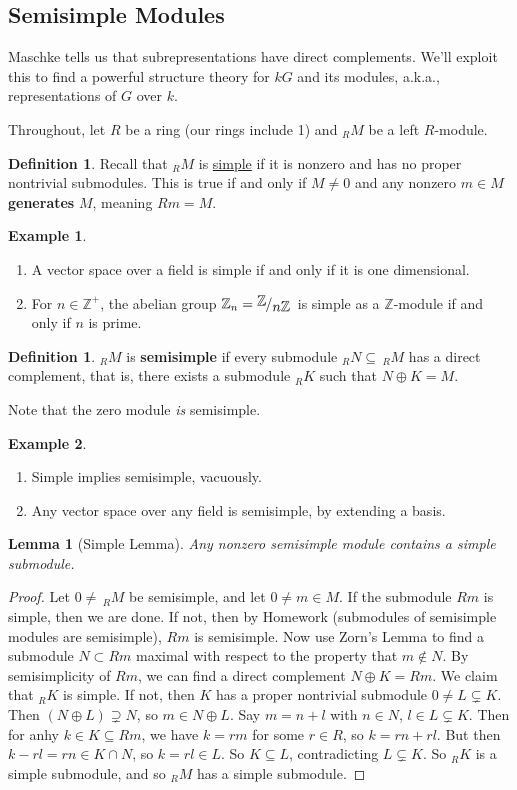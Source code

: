 \documentclass[12pt]{article}
\newcommand{\z}{\mathbb{Z}}
\newcommand{\ita}[1]{\textit{#1}}
\newcommand{\quotient}[2]{{\makebox[\width-2.3pt][l]{\raisebox{.2em}{$#1$}}\left/\raisebox{-.2em}{$#2$}\right.}}
\newtheorem{lemma}[theorem]{Lemma}
\theoremstyle{definition}
\newtheorem{definition}[theorem]{Definition}
\newtheorem{example}{Example}[section]
\begin{document}
\subsection{Semisimple Modules}
Maschke tells us that subrepresentations have direct complements. We'll exploit this to find a powerful structure theory for $kG$ and its modules, a.k.a., representations of $G$ over $k$.

Throughout, let $R$ be a ring (our rings include 1) and $_RM$ be a left $R$-module.
\begin{definition}
    Recall that $_RM$ is \underline{simple} if it is nonzero and has no proper nontrivial submodules. This is true if and only if $M\neq0$ and any nonzero $m\in M$ \textbf{generates} $M$, meaning $Rm=M$.
\end{definition}
\begin{example}
    \noindent
    \begin{enumerate}
        \item A vector space over a field is simple if and only if it is one dimensional.
        \item For $n\in\z^+$, the abelian group $\z_n=\quotient{\z}{n\z}$ is simple as a $\z$-module if and only if $n$ is prime.
    \end{enumerate}
\end{example}
\begin{definition}
    $_RM$ is \textbf{semisimple} if every submodule $_RN\subseteq\,_RM$ has a direct complement, that is, there exists a submodule $_RK$ such that $N\oplus K=M$.
\end{definition}
Note that the zero module \ita{is} semisimple.
\begin{example}
    \noindent
    \begin{enumerate}
        \item Simple implies semisimple, vacuously.
        \item Any vector space over any field is semisimple, by extending a basis.
    \end{enumerate}
\end{example}
\begin{lemma}[Simple Lemma]
    Any nonzero semisimple module contains a simple submodule.
\end{lemma}
\begin{proof}
    Let $0\neq\,_RM$ be semisimple, and let $0\neq m\in M$. If the submodule $Rm$ is simple, then we are done. If not, then by Homework (submodules of semisimple modules are semisimple), $Rm$ is semisimple. Now use Zorn's Lemma to find a submodule $N\subset Rm$ maximal with respect to the property that $m\notin N$. By semisimplicity of $Rm$, we can find a direct complement $N\oplus K=Rm$. We claim that $_RK$ is simple. If not, then $K$ has a proper nontrivial submodule $0\neq L\subsetneq K$. Then $(N\oplus L)\supsetneq N$, so $m\in N\oplus L$. Say $m=n+l$ with $n\in N$, $l\in L\subsetneq K$. Then for anhy $k\in K\subseteq Rm$, we have $k=rm$ for some $r\in R$, so $k=rn+rl$. But then $k-rl=rn\in K\cap N$, so $k=rl\in L$. So $K\subseteq L$, contradicting $L\subsetneq K$. So $_RK$ is a simple submodule, and so $_RM$ has a simple submodule.
\end{proof}
\end{document}
